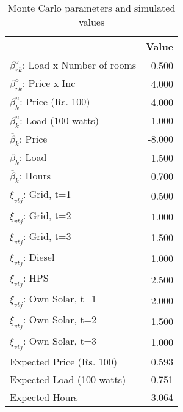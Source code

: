 \begin{table}[!ht]
	\centering
		\caption{Monte Carlo parameters and simulated values}
\begin{tabular}{lr}
		\toprule
               &     Value\\
		\midrule
		$\beta^o_{rk}$: Load x Number of rooms&     0.500\\
		$\beta^o_{rk}$: Price x Inc&     4.000\\
		$\beta^u_{k}$: Price (Rs. 100)&     4.000\\
		$\beta^u_{k}$: Load (100 watts)&     1.000\\
		$\overline{\beta}_k$: Price&    -8.000\\
		$\overline{\beta}_k$: Load&     1.500\\
		$\overline{\beta}_k$: Hours&     0.700\\
		$\xi_{vtj}$: Grid, t=1&     0.500\\
		$\xi_{vtj}$: Grid, t=2&     1.000\\
		$\xi_{vtj}$: Grid, t=3&     1.500\\
		$\xi_{vtj}$: Diesel&     1.000\\
		$\xi_{vtj}$: HPS&     2.500\\
		$\xi_{vtj}$: Own Solar, t=1&    -2.000\\
		$\xi_{vtj}$: Own Solar, t=2&    -1.500\\
		$\xi_{vtj}$: Own Solar, t=3&     1.000\\
		Expected Price (Rs. 100)&     0.593\\
		Expected Load (100 watts)&     0.751\\
		 Expected Hours&     3.064\\
		\bottomrule
	\end{tabular}
\end{table}
